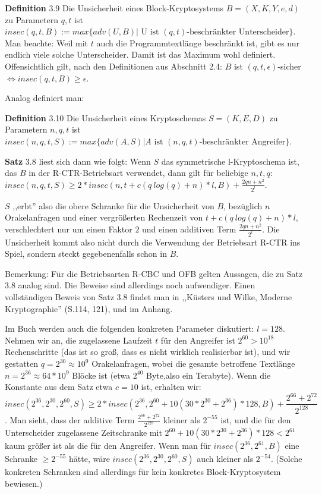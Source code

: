 \documentclass[a4paper]{article}
\begin{document}
\begin{multicols}{3}
    \textbf{Definition} 3.9 Die Unsicherheit eines Block-Kryptosystems $B=(X,K,Y,e,d)$ zu Parametern $q,t$ ist $insec(q,t,B) := max\{adv(U,B)|\text{ U ist } (q,t) \text{-beschränkter Unterscheider}\}$.
    Man beachte: Weil mit $t$ auch die Programmtextlänge beschränkt ist, gibt es nur endlich viele solche Unterscheider. Damit ist das Maximum wohl definiert. Offensichtlich gilt, nach den Definitionen aus Abschnitt 2.4: $B$ ist $(q,t,\epsilon)$-sicher $\Leftrightarrow insec(q,t,B)\geq\epsilon$.

    Analog definiert man:

    \textbf{Definition} 3.10 Die Unsicherheit eines Kryptoschemas $S=(K,E,D)$ zu Parametern $n,q,t$ ist $insec(n,q,t,S):=max\{adv(A,S)|A \text{ ist }(n,q,t)\text{-beschränkter Angreifer}\}$.

    \textbf{Satz} 3.8 liest sich dann wie folgt: Wenn $S$ das symmetrische l-Kryptoschema ist, das $B$ in der R-CTR-Betriebsart verwendet, dann gilt für beliebige $n,t,q$: $insec(n,q,t,S)\geq 2 * insec(n,t+c(q\ log(q) +n)*l,B) +\frac{2qn+n^2}{2^l}$.

    $S$ ,,erbt'' also die obere Schranke für die Unsicherheit von $B$, bezüglich $n$ Orakelanfragen und einer vergrößerten Rechenzeit von $t+c(q\ log(q) +n)*l$, verschlechtert nur um einen Faktor $2$ und einen additiven Term $\frac{2qn+n^2}{2^l}$. Die Unsicherheit kommt also nicht durch die Verwendung der Betriebsart R-CTR ins Spiel, sondern steckt gegebenenfalls schon in $B$.

    Bemerkung: Für die Betriebsarten R-CBC und OFB gelten Aussagen, die zu Satz 3.8 analog sind. Die Beweise sind allerdings noch aufwendiger. Einen vollständigen Beweis von Satz 3.8 findet man in ,,Küsters und Wilke, Moderne Kryptographie'' (S.114, 121), und im Anhang.

    Im Buch werden auch die folgenden konkreten Parameter diskutiert: $l=128$. Nehmen wir an, die zugelassene Laufzeit $t$ für den Angreifer ist $2^{60} > 10^{18}$ Rechenschritte (das ist so groß, dass es nicht wirklich realisierbar ist), und wir gestatten $q=2^{30} \approx 10^{9}$ Orakelanfragen, wobei die gesamte betroffene Textlänge $n=2^{36}\approx 64*10^9$ Blöcke ist (etwa $2^{40}$ Byte,also ein Terabyte). Wenn die Konstante aus dem Satz etwa $c=10$ ist, erhalten wir: $$insec(2^{36}, 2^{30}, 2^{60},S)\geq 2*insec(2^{36}, 2^{60}+ 10(30*2^{30}+ 2^{36})* 128 ,B) +\frac{2^{66} + 2^{72}}{2^{128}}$$.
    Man sieht, dass der additive Term $\frac{2^{66} +2^{72}}{2^{128}}$ kleiner als $2^{-55}$ ist, und die für den Unterscheider zugelassene Zeitschranke mit $2^{60} + 10(30* 2^{30}+2^{36})*128 < 2^{61}$ kaum größer ist als die für den Angreifer. Wenn man für $insec(2^{36}, 2^{61} ,B)$ eine Schranke $\geq 2^{-55}$ hätte, wäre $insec(2^{36}, 2^{30}, 2^{60},S)$ auch kleiner als $2^{-54}$. (Solche konkreten Schranken sind allerdings für kein konkretes Block-Kryptosystem bewiesen.)


\end{multicols}
\end{document}
